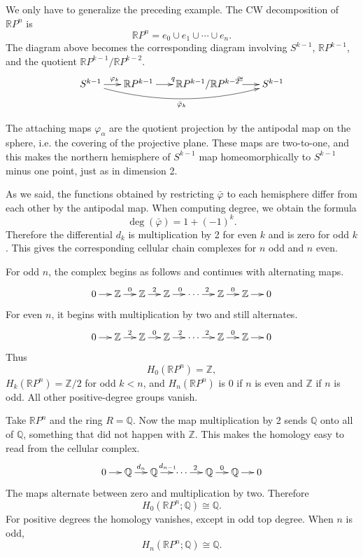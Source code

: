 \begin{example}[$\mathbb{R} P^n$]
We only have to generalize the preceding
example. The CW
decomposition of $\mathbb{R} P^n$ is
$$
\mathbb{R} P^n=e_0\cup e_1\cup\cdots\cup e_n.
$$
The diagram above becomes the corresponding
diagram involving
$S^{k-1}$, $\mathbb{R}P^{k-1}$, and the
quotient
$\mathbb{R}P^{k-1}/\mathbb{R}P^{k-2}$.
$$
\xymatrix@C=1.7em{
S^{k-1} \ar[r]^{\varphi_k}
  \ar@/_1.2pc/[rrr]_{\bar\varphi_k}
 & \mathbb{R}P^{k-1}
   \ar[r]^q
 & \mathbb{R}P^{k-1}/
   \mathbb{R}P^{k-2}
   \ar[r]^{\cong}
 & S^{k-1}
}
$$

The attaching maps $\varphi_\alpha$ are the
quotient
projection by the antipodal map on the
sphere, i.e. the
covering of the projective plane. These maps
are two-to-one,
and this makes the northern hemisphere of
$S^{k-1}$ map
homeomorphically to $S^{k-1}$ minus one
point, just as in
dimension 2.

As we said, the functions obtained by
restricting
$\bar\varphi$ to each hemisphere differ from
each other by the
antipodal map. When computing degree, we
obtain the formula
$$
\deg(\bar\varphi)=1+(-1)^k.
$$
Therefore
the differential $d_k$ is multiplication by
2 for even $k$ and is zero for odd $k$.
This gives the corresponding cellular chain
complexes for
$n$ odd and $n$ even.

For odd $n$, the complex begins as follows
and continues with alternating maps.
$$
\xymatrix@C=1.25em{
0 \ar[r]
 & \mathbb{Z} \ar[r]^0
 & \mathbb{Z} \ar[r]^2
 & \mathbb{Z} \ar[r]^0
 & \cdots \ar[r]^2
 & \mathbb{Z} \ar[r]^0
 & \mathbb{Z} \ar[r]
 & 0
}
$$
For even $n$, it begins with multiplication
by two and still alternates.
$$
\xymatrix@C=1.25em{
0 \ar[r]
 & \mathbb{Z} \ar[r]^2
 & \mathbb{Z} \ar[r]^0
 & \mathbb{Z} \ar[r]^2
 & \cdots \ar[r]^2
 & \mathbb{Z} \ar[r]^0
 & \mathbb{Z} \ar[r]
 & 0
}
$$
Thus
$$
H_0(\mathbb{R} P^n)=\mathbb{Z},
$$
$H_k(\mathbb{R} P^n)=\mathbb{Z}/2$ for odd
$k<n$, and $H_n(\mathbb{R} P^n)$ is $0$
if $n$ is even and $\mathbb{Z}$ if $n$ is
odd. All other positive-degree groups
vanish.
\end{example}

\begin{example}
Take $\mathbb{R} P^n$ and the ring
$R=\mathbb{Q}$. Now the map
multiplication by 2 sends $\mathbb{Q}$ onto
all of $\mathbb{Q}$, something
that did not happen with $\mathbb{Z}$. This
makes the homology
easy to read from the cellular complex.
$$
\xymatrix@C=1.25em{
0 \ar[r]
 & \mathbb{Q} \ar[r]^{d_n}
 & \mathbb{Q} \ar[r]^{d_{n-1}}
 & \cdots \ar[r]^2
 & \mathbb{Q} \ar[r]^0
 & \mathbb{Q} \ar[r]
 & 0
}
$$
The maps alternate between zero and
multiplication by two. Therefore
$$
H_0(\mathbb{R}P^n;\mathbb{Q})
\cong\mathbb{Q}.
$$
For positive degrees the homology vanishes,
except in odd top degree. When $n$ is odd,
$$
H_n(\mathbb{R}P^n;\mathbb{Q})
\cong\mathbb{Q}.
$$
\end{example}

